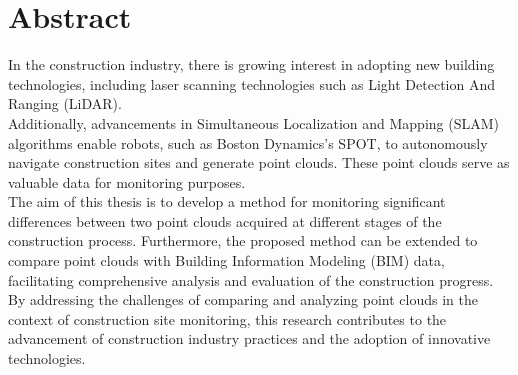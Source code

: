 \section*{Abstract}
In the construction industry, there is growing interest in adopting new building technologies, including laser scanning technologies such as Light Detection And Ranging (LiDAR).\\

Additionally, advancements in Simultaneous Localization and Mapping (SLAM) algorithms enable robots, such as Boston Dynamics's SPOT, to autonomously navigate construction sites and generate point clouds. These point clouds serve as valuable data for monitoring purposes.\\

The aim of this thesis is to develop a method for monitoring significant differences between two point clouds acquired at different stages of the construction process. Furthermore, the proposed method can be extended to compare point clouds with Building Information Modeling (BIM) data, facilitating comprehensive analysis and evaluation of the construction progress.\\

By addressing the challenges of comparing and analyzing point clouds in the context of construction site monitoring, this research contributes to the advancement of construction industry practices and the adoption of innovative technologies.